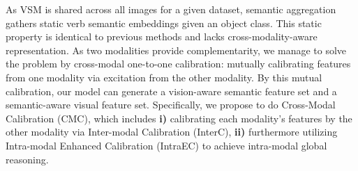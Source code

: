 \documentclass[letterpaper]{article} %
\begin{document}
As VSM is shared across all images for a given dataset, semantic aggregation gathers static verb semantic embeddings given an object class. This static property is identical to previous methods \cite{liu2020FCMFNet} and lacks cross-modality-aware representation. As two modalities provide complementarity, we manage to solve the problem by cross-modal one-to-one calibration: mutually calibrating features from one modality via excitation from the other modality. By this mutual calibration, our model can generate a vision-aware semantic feature set and a semantic-aware visual feature set. Specifically, we propose to do Cross-Modal Calibration (CMC), which includes \textbf{i)} calibrating each modality's features by the other modality via Inter-modal Calibration (InterC), \textbf{ii)} furthermore utilizing Intra-modal Enhanced Calibration (IntraEC) \cite{AttentionAlluNeed,lin2020gps} to achieve intra-modal global reasoning. 


\end{document}
